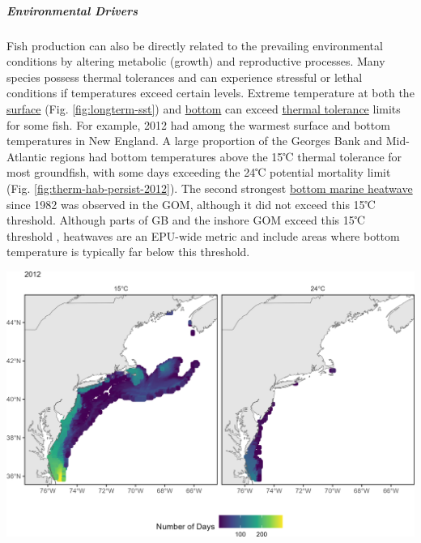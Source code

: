 \documentclass[
  10pt,
]{article}
\let\origfigure\figure
\let\endorigfigure\endfigure
\renewenvironment{figure}[1][2] {
    \expandafter\origfigure\expandafter[H]
} {
    \endorigfigure
}
\begin{document}
\hypertarget{environmental-drivers}{%
\subparagraph{Environmental Drivers}\label{environmental-drivers}}

Fish production can also be directly related to the prevailing environmental conditions by altering metabolic (growth) and reproductive processes. Many species possess thermal tolerances and can experience stressful or lethal conditions if temperatures exceed certain levels. Extreme temperature at both the \href{https://noaa-edab.github.io/catalog/seasonal_oisst_anom.html}{surface} (Fig. \ref{fig:longterm-sst}) and \href{https://noaa-edab.github.io/catalog/bottom_temp_comp.html}{bottom} can exceed \href{https://noaa-edab.github.io/catalog/thermal_habitat_persistence.html}{thermal tolerance} limits for some fish. For example, 2012 had among the warmest surface and bottom temperatures in New England. A large proportion of the Georges Bank and Mid-Atlantic regions had bottom temperatures above the 15℃ thermal tolerance for most groundfish, with some days exceeding the 24℃ potential mortality limit (Fig. \ref{fig:therm-hab-persist-2012}). The second strongest \href{https://noaa-edab.github.io/catalog/heatwave_year.html}{bottom marine heatwave} since 1982 was observed in the GOM, although it did not exceed this 15℃ threshold. Although parts of GB and the inshore GOM exceed this 15℃ threshold , heatwaves are an EPU-wide metric and include areas where bottom temperature is typically far below this threshold.

\begin{figure}

{\centering \includegraphics[width=0.9\linewidth]{images/thermal_habitat_2012_cropped} 

}

\caption{The number of days in 2012 where bottom temperature exceeds 15℃ (left) and 24℃ (right) based on the GLORYS 1/12 degree grid.}\label{fig:therm-hab-persist-2012}
\end{figure}
\end{document}
